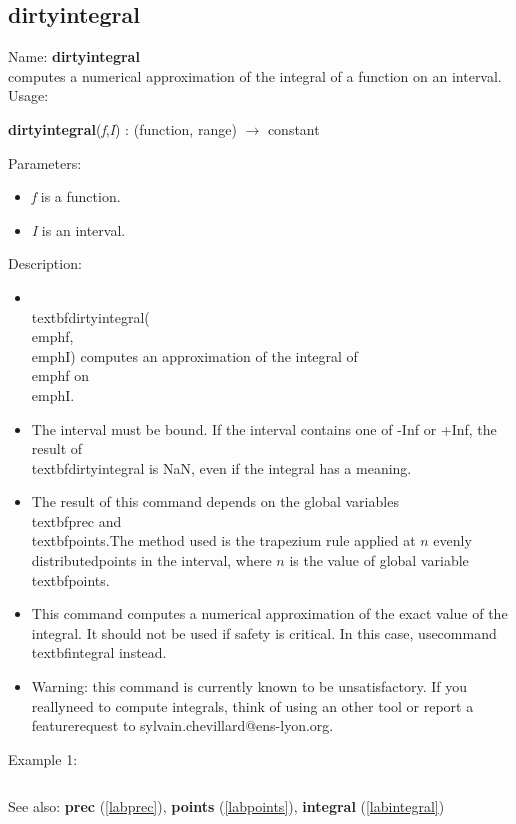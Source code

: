 \subsection{dirtyintegral}
\label{labdirtyintegral}
\noindent Name: \textbf{dirtyintegral}\\
computes a numerical approximation of the integral of a function on an interval.\\
\noindent Usage: 
\begin{center}
\textbf{dirtyintegral}(\emph{f},\emph{I}) : (\textsf{function}, \textsf{range}) $\rightarrow$ \textsf{constant}\\
\end{center}
Parameters: 
\begin{itemize}
\item \emph{f} is a function.
\item \emph{I} is an interval.
\end{itemize}
\noindent Description: \begin{itemize}

\item \\textbf{dirtyintegral}(\\emph{f},\\emph{I}) computes an approximation of the integral of \\emph{f} on \\emph{I}.\n
\item The interval must be bound. If the interval contains one of -Inf or +Inf, the \n   result of \\textbf{dirtyintegral} is NaN, even if the integral has a meaning.\n
\item The result of this command depends on the global variables \\textbf{prec} and \\textbf{points}.\n   The method used is the trapezium rule applied at $n$ evenly distributed\n   points in the interval, where $n$ is the value of global variable \\textbf{points}.\n
\item This command computes a numerical approximation of the exact value of the \n   integral. It should not be used if safety is critical. In this case, use\n   command \\textbf{integral} instead.\n
\item Warning: this command is currently known to be unsatisfactory. If you really\n   need to compute integrals, think of using an other tool or report a feature\n   request to sylvain.chevillard@ens-lyon.org.\n\end{itemize}
\noindent Example 1: 
\begin{center}\begin{minipage}{15cm}\begin{Verbatim}[frame=single]
\end{Verbatim}
\end{minipage}\end{center}
See also: \textbf{prec} (\ref{labprec}), \textbf{points} (\ref{labpoints}), \textbf{integral} (\ref{labintegral})
